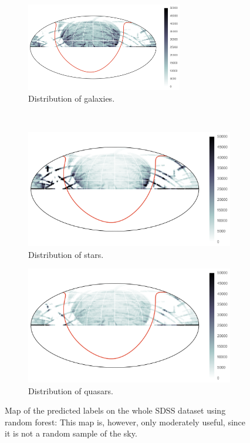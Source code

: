\begin{figure}[p]
	\centering
	\begin{subfigure}{\textwidth}
		\centering
		\includegraphics[width=0.75\textwidth]{figures/4_expt1/map_prediction_forest_galaxies}
		\caption{Distribution of galaxies.}
		\label{fig:random1}
	\end{subfigure}\\
	\begin{subfigure}{\textwidth}
		\centering
		\includegraphics[width=0.75\linewidth]{figures/4_expt1/map_prediction_forest_stars}
		\caption{Distribution of stars.}
		\label{fig:random2}
	\end{subfigure}
	\begin{subfigure}{\textwidth}
		\centering
		\includegraphics[width=0.75\linewidth]{figures/4_expt1/map_prediction_forest_quasars}
		\caption{Distribution of quasars.}
		\label{fig:random3}
	\end{subfigure}
	\caption[Map of predicted labels on all SDSS data.]{
		Map of the predicted labels on the whole SDSS dataset using random forest: This
		map is, however, only moderately useful, since it is not a random sample of the sky.}
	\label{fig:forest}
\end{figure}


